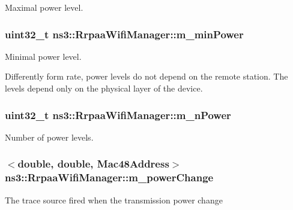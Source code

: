 Maximal power level. 

\subsubsection[{\texorpdfstring{m\+\_\+min\+Power}{m_minPower}}]{\setlength{\rightskip}{0pt plus 5cm}uint32\+\_\+t ns3\+::\+Rrpaa\+Wifi\+Manager\+::m\+\_\+min\+Power\hspace{0.3cm}{\ttfamily [private]}}\hypertarget{classns3_1_1RrpaaWifiManager_a2df897d246e52f36e94520c70a9026ab}{}\label{classns3_1_1RrpaaWifiManager_a2df897d246e52f36e94520c70a9026ab}


Minimal power level. 

Differently form rate, power levels do not depend on the remote station. The levels depend only on the physical layer of the device. 
\subsubsection[{\texorpdfstring{m\+\_\+n\+Power}{m_nPower}}]{\setlength{\rightskip}{0pt plus 5cm}uint32\+\_\+t ns3\+::\+Rrpaa\+Wifi\+Manager\+::m\+\_\+n\+Power\hspace{0.3cm}{\ttfamily [private]}}\hypertarget{classns3_1_1RrpaaWifiManager_a109cb03ae105835a26ff09f82c5db6a2}{}\label{classns3_1_1RrpaaWifiManager_a109cb03ae105835a26ff09f82c5db6a2}


Number of power levels. 

\subsubsection[{\texorpdfstring{m\+\_\+power\+Change}{m_powerChange}}]{$<$double, double, {\bf Mac48\+Address}$>$ ns3\+::\+Rrpaa\+Wifi\+Manager\+::m\+\_\+power\+Change\hspace{0.3cm}{\ttfamily [private]}}\hypertarget{classns3_1_1RrpaaWifiManager_a4f6bc3b3289bae4f456cff3062a6ebc0}{}\label{classns3_1_1RrpaaWifiManager_a4f6bc3b3289bae4f456cff3062a6ebc0}
The trace source fired when the transmission power change 
